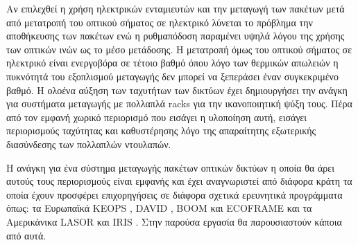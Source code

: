 Αν επιλεχθεί η χρήση ηλεκτρικών ενταμιευτών και την μεταγωγή των
πακέτων μετά από μετατροπή του οπτικού σήματος σε ηλεκτρικό λύνεται το
πρόβλημα την αποθήκευσης των πακέτων ενώ η ρυθμαπόδοση παραμένει υψηλά
λόγου της χρήσης των οπτικών ινών ως το μέσο μετάδοσης. Η μετατροπή
όμως του οπτικού σήματος σε ηλεκτρικό είναι ενεργοβόρα σε τέτοιο βαθμό
όπου λόγο των θερμικών απωλειών η πυκνότητά του εξοπλισμού μεταγωγής
δεν μπορεί να ξεπεράσει έναν συγκεκριμένο βαθμό. Η ολοένα αύξηση των
ταχυτήτων των δικτύων έχει δημιουργήσει την ανάγκη για συστήματα
μεταγωγής με πολλαπλά racks για την ικανοποιητική ψύξη τους. Πέρα
από τον εμφανή χωρικό περιορισμό που εισάγει η υλοποίηση αυτή, εισάγει
περιορισμούς ταχύτητας και καθυστέρησης λόγο της απαραίτητης
εξωτερικής διασύνδεσης των πολλαπλών ντουλαπών.

Η ανάγκη για ένα σύστημα μεταγωγής πακέτων οπτικών δικτύων η οποία θα
άρει αυτούς τους περιορισμούς είναι εμφανής και έχει αναγνωριστεί από
διάφορα κράτη τα οποία έχουν προσφέρει επιχορηγήσεις σε διάφορα
σχετικά ερευνητικά προγράμματα όπως: τα Ευρωπαϊκά KEOPS \cite{736580},
DAVID \cite{1230193}, BOOM \cite{5398841} και ECOFRAME \cite{5465485}
και τα Αμερικάνικα LASOR \cite{4804163} και IRIS \cite{IRIS}. Στην
παρούσα εργασία θα παρουσιαστούν κάποια από αυτά.

